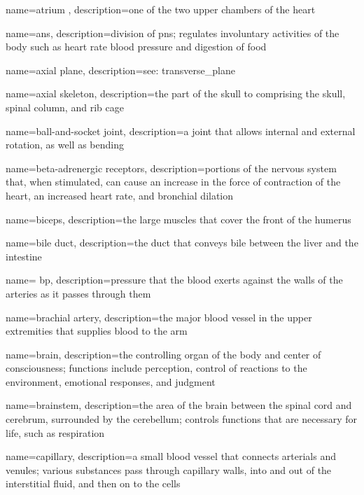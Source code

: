 \documentclass[../../EMT-169.tex]{subfiles}
\begin{document}
	{
		name=atrium ,
		description={one of the two upper chambers of the heart}
	}

	{
		name=\acrlong{ans},
		description={division of \acrlong{pns}; regulates involuntary activities of the body such as heart rate blood pressure and digestion of food}
	}

	{
		name=axial plane,
		description={see: \gls{transverse_plane}}
	}

	{
		name=axial skeleton,
		description={the part of the skull to comprising the skull, spinal column, and rib cage}
	}

	{
		name=ball-and-socket joint,
		description={a joint that allows internal and external rotation, as well as bending}
	}
	
	{
		name=beta-adrenergic receptors,
		description={portions of the nervous system that, when stimulated, can cause an increase in the force of contraction of the heart, an increased heart rate, and bronchial dilation}
	}
	
	{
		name=biceps,
		description={the large muscles that cover the front of the humerus}
	}
	
	{
		name=bile duct,
		description={the duct that conveys bile between the liver and the intestine}
	}
	
	{
		name= \acrlong{bp},
		description={pressure that the blood exerts against the walls of the arteries as it passes through them}
	}
	
	{
		name=brachial artery,
		description={the major blood vessel in the upper extremities that supplies blood to the arm}
	}
	
	{
		name=brain,
		description={the controlling organ of the body and center of consciousness; functions include perception, control of reactions to the environment, emotional responses, and judgment}
	}
	
	{
		name=brainstem,
		description={the area of the brain between the spinal cord and cerebrum, surrounded by the cerebellum; controls functions that are necessary for life, such as respiration}
	}

	{
		name=capillary,
		description={a small blood vessel that connects arterials and venules; various substances pass through capillary walls, into and out of the interstitial fluid, and then on to the cells}
	}
\end{document}

